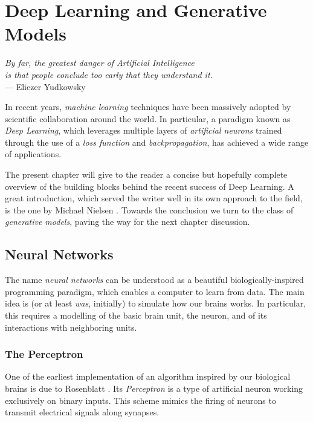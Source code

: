 \chapter{Deep Learning and Generative Models}\label{ch:dlgm}
\begin{flushright}{\slshape
        By far, the greatest danger of Artificial Intelligence \\
        is that people conclude too early that they understand it.} \\ \medskip
    --- Eliezer Yudkowsky
\end{flushright}

In recent years, \emph{machine learning} techniques have been massively adopted by scientific collaboration around the world. In particular, a paradigm known as \emph{Deep Learning}, which leverages multiple layers of \emph{artificial neurons} trained through the use of a \emph{loss function} and \emph{backpropagation}, has achieved a wide range of applications.

The present chapter will give to the reader a concise but hopefully complete overview of the building blocks behind the recent success of Deep Learning. A great introduction, which served the writer well in its own approach to the field, is the one by Michael Nielsen \cite{nielsenneural}. Towards the conclusion we turn to the class of \emph{generative models}, paving the way for the next chapter discussion.
	

\section{Neural Networks}

The name \emph{neural networks} can be understood as a beautiful biologically-inspired programming paradigm, which enables a computer to learn from data. The main idea is (or at least \emph{was}, initially) to simulate how our brains works. In particular, this requires a modelling of the basic brain unit, the neuron, and of its interactions with neighboring units.

\subsection{The Perceptron}

One of the earliest implementation of an algorithm inspired  by our biological brains is due to Rosenblatt \cite{Rosenblatt1958ThePA}. Its \emph{Perceptron} is a type of artificial neuron working exclusively on binary inputs. This scheme mimics the firing of neurons to transmit electrical signals along synapses.

